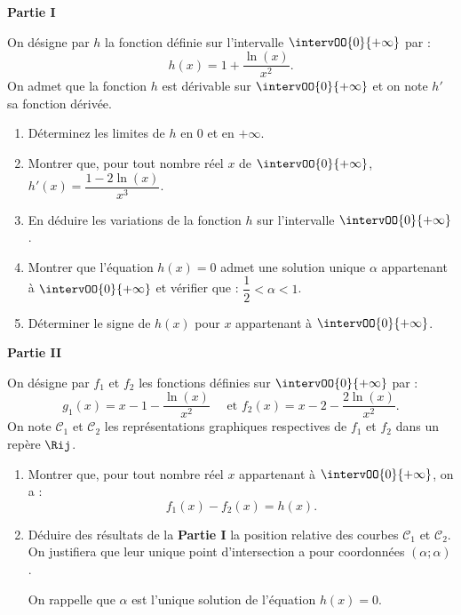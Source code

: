 \begin{center}
	\textbf{Partie I}
\end{center}

On désigne par $h$ la fonction définie sur l’intervalle $\intervOO{0}{+\infty}$ par : \[ h(x)=1+\dfrac{\ln(x)}{x^2}. \]
On admet que la fonction $h$ est dérivable sur $\intervOO{0}{+\infty}$ et on note $h'$ sa fonction dérivée.

\begin{enumerate}
	\item Déterminez les limites de $h$ en $0$ et en $+\infty$.
	\item Montrer que, pour tout nombre réel $x$ de $\intervOO{0}{+\infty}$, $h'(x)=\dfrac{1-2\ln(x)}{x^3}$.
	\item En déduire les variations de la fonction $h$ sur l’intervalle $\intervOO{0}{+\infty}$.
	\item Montrer que l’équation $h(x)=0$ admet une solution unique $\alpha$ appartenant à $\intervOO{0}{+\infty}$ et vérifier que : $\dfrac12 < \alpha < 1$.
	\item Déterminer le signe de $h(x)$ pour $x$ appartenant à $\intervOO{0}{+\infty}$.
\end{enumerate}

\begin{center}
	\textbf{Partie II}
\end{center}

On désigne par $f_1$ et $f_2$ les fonctions définies sur $\intervOO{0}{+\infty}$ par : \[ g_1(x)=x-1-\dfrac{\ln(x)}{x^2} \quad \text{ et } f_2(x)= x-2-\dfrac{2\ln(x)}{x^2}. \]
On note $\mathcal{C}_1$ et $\mathcal{C}_2$ les représentations graphiques respectives de $f_1$ et $f_2$ dans un repère $\Rij$.

\begin{enumerate}
	\item Montrer que, pour tout nombre réel $x$ appartenant à $\intervOO{0}{+\infty}$, on a : \[ f_1(x)-f_2(x) = h(x). \]
	\item Déduire des résultats de la \textbf{Partie I} la position relative des courbes $\mathcal{C}_1$ et $\mathcal{C}_2$. On justifiera que leur unique point d’intersection a pour coordonnées $(\alpha;\alpha)$.
	
	On rappelle que $\alpha$ est l’unique solution de l’équation $h(x)=0$.
\end{enumerate}

